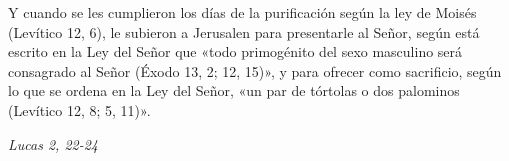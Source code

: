 \documentclass[../../devocionario.tex]{subfiles}
\begin{document}
    Y cuando se les cumplieron los días de la purificación según la ley de Moisés (Levítico 12, 6), 
    le subieron a Jerusalen para presentarle al Señor, según está escrito en la Ley del Señor que «todo primogénito 
    del sexo masculino será consagrado al Señor (Éxodo 13, 2; 12, 15)», y para ofrecer como sacrificio, 
    según lo que se ordena en la Ley del Señor, «un par de tórtolas o dos palominos (Levítico 12, 8; 5, 11)». 
    \begin{flushright}
        \textit{Lucas 2, 22-24}
    \end{flushright}
\end{document}

